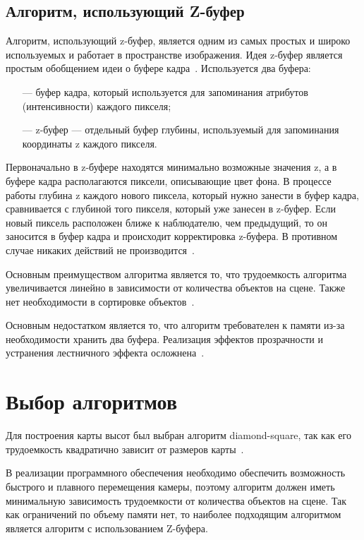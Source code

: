 \documentclass[a4paper, 14pt]{extreport}
\begin{document}
\subsection{Алгоритм, использующий Z-буфер}

Алгоритм, использующий z-буфер, является одним из самых простых и широко используемых и работает в пространстве 
изображения. Идея z-буфер является простым обобщением идеи о буфере кадра~\cite{rodjers}. Используется два буфера:
\begin{itemize}
	\item[---] буфер кадра, который используется для запоминания атрибутов (интенсивности) каждого пикселя;
	\item[---] z-буфер --- отдельный буфер глубины, используемый для запоминания координаты z каждого пикселя.
\end{itemize}

Первоначально в z-буфере находятся минимально возможные значения z, а в буфере кадра располагаются пиксели, 
описывающие цвет фона. В процессе работы глубина z каждого нового пиксела, который нужно занести в буфер кадра, 
сравнивается с глубиной того пикселя, который уже занесен в z-буфер. Если новый пиксель расположен ближе к наблюдателю, 
чем предыдущий, то он заносится в буфер кадра и происходит корректировка z-буфера. В противном случае никаких действий 
не производится~\cite{gonhchan}.

Основным преимуществом алгоритма является то, что трудоемкость алгоритма увеличивается линейно в зависимости от 
количества объектов на сцене. Также нет необходимости в сортировке объектов~\cite{polsky}.

Основным недостатком является то, что алгоритм требователен к памяти из-за необходимости хранить два буфера.
Реализация эффектов прозрачности и устранения лестничного эффекта осложнена~\cite{polsky}.

\section{Выбор алгоритмов}

Для построения карты высот был выбран алгоритм diamond-square, так как его трудоемкость квадратично зависит от
размеров карты~\cite{fractal}.

В реализации программного обеспечения необходимо обеспечить возможность быстрого и плавного перемещения камеры, 
поэтому алгоритм должен иметь минимальную зависимость трудоемкости от количества объектов на сцене. Так как 
ограничений по объему памяти нет, то наиболее подходящим алгоритмом является алгоритм с использованием Z-буфера.
\end{document}
